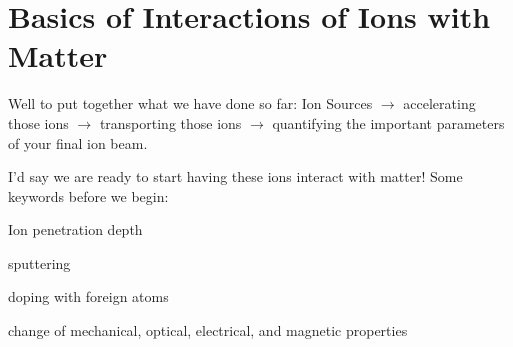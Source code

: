 
\chapter{Basics of Interactions of Ions with Matter}\label{ch:basics-of-interactions-of-ions-with-matter}
Well to put together what we have done so far: Ion Sources $\rightarrow$ accelerating those ions $\rightarrow$ transporting those ions $\rightarrow$ quantifying the important parameters of your final ion beam.

I'd say we are ready to start having these ions interact with matter!
Some keywords before we begin:

\begin{myitemize}
\item Ion penetration depth
\item sputtering
\item doping with foreign atoms
\item change of mechanical, optical, electrical, and magnetic properties
\end{myitemize}

